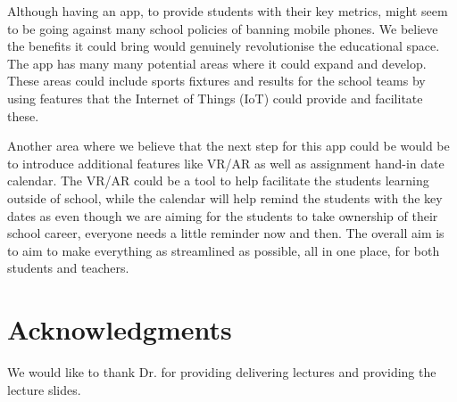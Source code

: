 \documentclass{sigchi}
\begin{document}
Although having an app, to provide students with their key metrics, might seem to be going against many school policies of banning mobile phones. We believe the benefits it could bring would genuinely revolutionise the educational space. The app has many many potential areas where it could expand and develop. These areas could include sports fixtures and results for the school teams by using features that the Internet of Things (IoT) could provide and facilitate these.  

Another area where we believe that the next step for this app could be would be to introduce additional features like VR/AR as well as assignment hand-in date calendar. The VR/AR could be a tool to help facilitate the students learning outside of school, while the calendar will help remind the students with the key dates as even though we are aiming for the students to take ownership of their school career, everyone needs a little reminder now and then. The overall aim is to aim to make everything as streamlined as possible, all in one place, for both students and teachers.

\section{Acknowledgments}

We would like to thank Dr.   for providing delivering lectures and providing the lecture slides.

%
%
%
%
%
\balance{}



\balance{}



\end{document}
